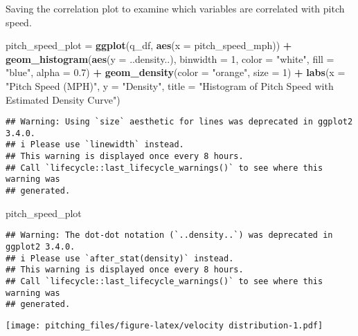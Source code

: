 \documentclass[
]{article}
\newenvironment{Shaded}{\begin{snugshade}}{\end{snugshade}}
\newcommand{\AttributeTok}[1]{\textcolor[rgb]{0.13,0.29,0.53}{#1}}
\newcommand{\DecValTok}[1]{\textcolor[rgb]{0.00,0.00,0.81}{#1}}
\newcommand{\FloatTok}[1]{\textcolor[rgb]{0.00,0.00,0.81}{#1}}
\newcommand{\FunctionTok}[1]{\textcolor[rgb]{0.13,0.29,0.53}{\textbf{#1}}}
\newcommand{\NormalTok}[1]{#1}
\newcommand{\OtherTok}[1]{\textcolor[rgb]{0.56,0.35,0.01}{#1}}
\newcommand{\SpecialCharTok}[1]{\textcolor[rgb]{0.81,0.36,0.00}{\textbf{#1}}}
\newcommand{\StringTok}[1]{\textcolor[rgb]{0.31,0.60,0.02}{#1}}
\begin{document}
Saving the correlation plot to examine which variables are correlated
with pitch speed.

\begin{Shaded}
\begin{Highlighting}[]
\NormalTok{pitch\_speed\_plot }\OtherTok{=} \FunctionTok{ggplot}\NormalTok{(q\_df, }\FunctionTok{aes}\NormalTok{(}\AttributeTok{x =}\NormalTok{ pitch\_speed\_mph)) }\SpecialCharTok{+}
  \FunctionTok{geom\_histogram}\NormalTok{(}\FunctionTok{aes}\NormalTok{(}\AttributeTok{y =}\NormalTok{ ..density..), }\AttributeTok{binwidth =} \DecValTok{1}\NormalTok{, }\AttributeTok{color =} \StringTok{"white"}\NormalTok{, }\AttributeTok{fill =} \StringTok{"blue"}\NormalTok{, }\AttributeTok{alpha =} \FloatTok{0.7}\NormalTok{) }\SpecialCharTok{+}
  \FunctionTok{geom\_density}\NormalTok{(}\AttributeTok{color =} \StringTok{"orange"}\NormalTok{, }\AttributeTok{size =} \DecValTok{1}\NormalTok{) }\SpecialCharTok{+}
  \FunctionTok{labs}\NormalTok{(}\AttributeTok{x =} \StringTok{"Pitch Speed (MPH)"}\NormalTok{,}
       \AttributeTok{y =} \StringTok{"Density"}\NormalTok{,}
       \AttributeTok{title =} \StringTok{"Histogram of Pitch Speed with Estimated Density Curve"}\NormalTok{)}
\end{Highlighting}
\end{Shaded}

\begin{verbatim}
## Warning: Using `size` aesthetic for lines was deprecated in ggplot2 3.4.0.
## i Please use `linewidth` instead.
## This warning is displayed once every 8 hours.
## Call `lifecycle::last_lifecycle_warnings()` to see where this warning was
## generated.
\end{verbatim}

\begin{Shaded}
\begin{Highlighting}[]
\NormalTok{pitch\_speed\_plot}
\end{Highlighting}
\end{Shaded}

\begin{verbatim}
## Warning: The dot-dot notation (`..density..`) was deprecated in ggplot2 3.4.0.
## i Please use `after_stat(density)` instead.
## This warning is displayed once every 8 hours.
## Call `lifecycle::last_lifecycle_warnings()` to see where this warning was
## generated.
\end{verbatim}

\texttt{[image: pitching\_files/figure-latex/velocity distribution-1.pdf]}
\end{document}

